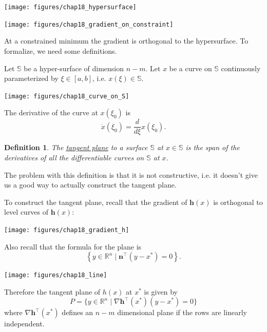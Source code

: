 \documentclass{article}
\newtheorem{definition}[theorem]{Definition}
\newcommand{\hbf}{\mathbf{h}}
\newcommand{\nbf}{\mathbf{n}}
\begin{document}
	\begin{center}
		\texttt{[image: figures/chap18\_hypersurface]}
	\end{center}
	
\par{}
	\begin{center}
		\texttt{[image: figures/chap18\_gradient\_on\_constraint]}
	\end{center}
	
	At a constrained minimum the gradient is orthogonal to the hypersurface.
%
	To formalize, we need some definitions.
	
	Let $\mathbb{S}$ be a hyper-surface of dimension $n-m$.  Let $x$ be a curve on $\mathbb{S}$ continuously parameterized by $\xi \in [a,b]$, i.e. $x(\xi) \in \mathbb{S}$.
	
	\begin{center}
		\texttt{[image: figures/chap18\_curve\_on\_S]}
	\end{center}
	
	The derivative of the curve at $x(\xi_0)$ is 
	\[
		\dot{x}(\xi_0) = \frac{d}{d\xi}x(\xi_0).
	\]	

	\begin{definition}
		The \underline{tangent plane} to a surface $\mathbb{S}$ at $x \in \mathbb{S}$ is the span of the derivatives of all the differentiable curves on $\mathbb{S}$ at $x$.
	\end{definition}   

	The problem with this definition is that it is not constructive, i.e. it doesn't give us a good way to actually construct the tangent plane.
	
	To construct the tangent plane, recall that the gradient of $\hbf(x)$ is orthogonal to level curves of $\hbf(x)$:
	\begin{center}
		\texttt{[image: figures/chap18\_gradient\_h]}
	\end{center}	
	Also recall that the formula for the plane is
	\[
		\left\{ y\in \mathbb{R}^n \mid \nbf^\top (y-x^{\ast})=0 \right\}.
	\]
	\begin{center}
		\texttt{[image: figures/chap18\_line]}
	\end{center}

	Therefore the tangent plane of $h(x)$ at $x^{\ast}$ is given by
	\[ 
		P = \{ y\in \mathbb{R}^n \mid \nabla \hbf^\top (x^{\ast})(y-x^{\ast}) =0 \} 
	\]
	where $\nabla \hbf^\top (x^{\ast})$ defines an $n-m$ dimensional plane if the rows are linearly independent.
\end{document}
